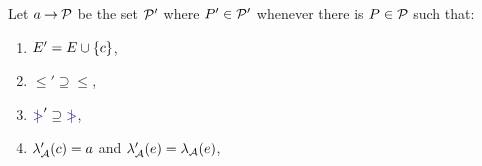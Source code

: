 

\begin{definition}
  \label{def:prefix}
Let $a \mathbin\rightarrow \mathcal{P}$ be the set $\mathcal{P}'$ where $P'\in\mathcal{P}'$ whenever
there is $P\in\mathcal{P}$ such that:
\begin{enumerate}
\item $E' = E \cup \{c\}$,
\item ${\le'}\supseteq{\le}$, %
\item ${\mathrel{{\color{blue}\mkern4mu\mid\!\!\!>}}'}\supseteq{\mathrel{{\color{blue}\mkern4mu\mid\!\!\!>}}}$, %
\item $\lambda_{\mathcal{A}}'(c) = a$ and $\lambda_{\mathcal{A}}'(e) = \lambda_{\mathcal{A}}(e)$,

\end{enumerate}
\end{definition}
